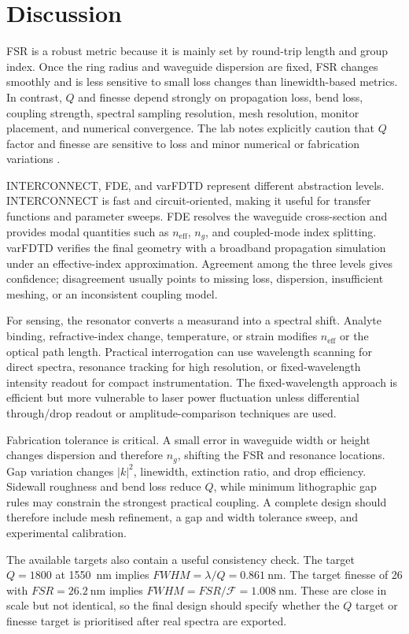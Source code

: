 \section{Discussion}
FSR is a robust metric because it is mainly set by round-trip length and group index. Once the ring radius and waveguide dispersion are fixed, FSR changes smoothly and is less sensitive to small loss changes than linewidth-based metrics. In contrast, \(Q\) and finesse depend strongly on propagation loss, bend loss, coupling strength, spectral sampling resolution, mesh resolution, monitor placement, and numerical convergence. The lab notes explicitly caution that \(Q\) factor and finesse are sensitive to loss and minor numerical or fabrication variations \cite{labmanual}.

INTERCONNECT, FDE, and varFDTD represent different abstraction levels. INTERCONNECT is fast and circuit-oriented, making it useful for transfer functions and parameter sweeps. FDE resolves the waveguide cross-section and provides modal quantities such as \(n_{\mathrm{eff}}\), \(n_g\), and coupled-mode index splitting. varFDTD verifies the final geometry with a broadband propagation simulation under an effective-index approximation. Agreement among the three levels gives confidence; disagreement usually points to missing loss, dispersion, insufficient meshing, or an inconsistent coupling model.

For sensing, the resonator converts a measurand into a spectral shift. Analyte binding, refractive-index change, temperature, or strain modifies \(n_{\mathrm{eff}}\) or the optical path length. Practical interrogation can use wavelength scanning for direct spectra, resonance tracking for high resolution, or fixed-wavelength intensity readout for compact instrumentation. The fixed-wavelength approach is efficient but more vulnerable to laser power fluctuation unless differential through/drop readout or amplitude-comparison techniques are used.

Fabrication tolerance is critical. A small error in waveguide width or height changes dispersion and therefore \(n_g\), shifting the FSR and resonance locations. Gap variation changes \(|k|^2\), linewidth, extinction ratio, and drop efficiency. Sidewall roughness and bend loss reduce \(Q\), while minimum lithographic gap rules may constrain the strongest practical coupling. A complete design should therefore include mesh refinement, a gap and width tolerance sweep, and experimental calibration.

The available targets also contain a useful consistency check. The target \(Q=1800\) at \SI{1550}{\nano\metre} implies \(FWHM=\lambda/Q=\SI{0.861}{\nano\metre}\). The target finesse of 26 with \(FSR=\SI{26.2}{\nano\metre}\) implies \(FWHM=FSR/\mathcal{F}=\SI{1.008}{\nano\metre}\). These are close in scale but not identical, so the final design should specify whether the \(Q\) target or finesse target is prioritised after real spectra are exported.
